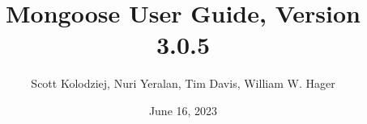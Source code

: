 \title{Mongoose User Guide, Version 3.0.5}
\author{Scott Kolodziej, Nuri Yeralan, Tim Davis, William W. Hager}
\date{June 16, 2023}
